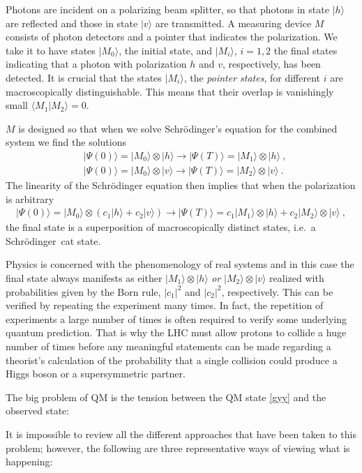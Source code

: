 \documentclass[12pt]{article}
\theoremstyle{plain}
\theoremstyle{definition}
\theoremstyle{remark}
\def\SCH{Schr\"odinger\ }
\def\bra#1{\langle #1|}
\def\ket#1{| #1\rangle}
\newcommand{\EQ}[1]{\begin{equation}\begin{split} #1
\end{split}\end{equation}}
\begin{document}
Photons are incident on a polarizing beam splitter, so that photons in state $\ket{h}$ are reflected and those in state $\ket{v}$ are transmitted. A measuring device $M$ consists of photon detectors and a pointer that indicates the polarization. We take it to have states $\ket{M_0}$, the initial state, and $\ket{M_i}$, $i=1,2$ the final states indicating that a 
photon with polarization $h$ and $v$, respectively, has been detected. It is crucial that the 
states $\ket{M_i}$,  the {\it pointer states\/}, for different $i$ are macroscopically distinguishable. This means that their overlap is vanishingly small $\bra{M_1}M_2\rangle=0$.

$M$ is designed so that when we solve Schr\"odinger's equation for the combined system we find the solutions
\EQ{
&\ket{\Psi(0)}=\ket{M_0}\otimes\ket{h}\longrightarrow\ket{\Psi(T)}=\ket{M_1}\otimes\ket{h}\ ,\\[3pt]
&\ket{\Psi(0)}=\ket{M_0}\otimes\ket{v}\longrightarrow\ket{\Psi(T)}=\ket{M_2}\otimes\ket{v}\ .
}
The linearity of the Schr\"odinger equation then implies that when the polarization is arbitrary
\EQ{
\ket{\Psi(0)}=\ket{M_0}\otimes(c_1\ket{h}+c_2\ket{v})\longrightarrow\ket{\Psi(T)}=c_1\ket{M_1}\otimes\ket{h}+c_2\ket{M_2}\otimes\ket{v}\ ,
\label{gyy}
}
the final state is a superposition of macroscopically distinct states, i.e.~a \SCH cat state. 

Physics is concerned with the phenomenology of real systems and in this case the final state always manifests as either $\ket{M_1}\otimes\ket{h}$ {\it or\/} $\ket{M_2}\otimes\ket{v}$ realized with probabilities given by the Born rule, $|c_1|^2$ 
and $|c_2|^2$, respectively. This can be verified by repeating the experiment many times. In fact, the repetition of experiments a large number of times is often required to verify some underlying quantum prediction. That is why the LHC must allow protons to collide a huge number of times before any meaningful statements can be made regarding a theorist's calculation of the probability that a single collision could produce a Higgs boson or a supersymmetric partner.

The big problem of QM is the tension between the QM state \eqref{gyy} and the observed state:
\begin{center}
\end{center}
It is impossible to review all the different approaches that have been taken to this problem; however, the
following are three representative ways of viewing what is happening:
\end{document}
